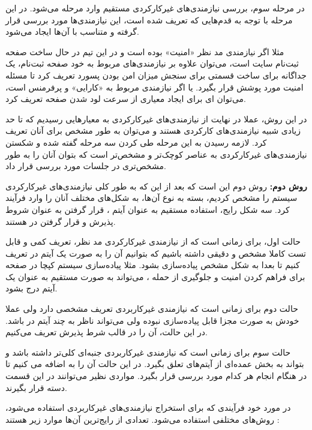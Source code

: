 {\begin{enumerate}[a)]
	در مرحله سوم، بررسی نیازمندی‌های غیرکارکردی مستقیم وارد مرحله  می‌شود. در این مرحله با توجه به قدم‌هایی که تعریف شده است، این نیازمندی‌ها مورد بررسی قرار گرفته و متناسب با آن‌ها  ایجاد می‌شود.
	
	مثلا اگر نیازمندی مد نظر «امنیت» بوده است و در این  تیم در حال ساخت صفحه ثبت‌نام سایت است، می‌توان علاوه بر نیازمندی‌های مربوط به خود صفحه ثبت‌نام، یک  جداگانه برای ساخت قسمتی برای سنجش میزان امن بودن پسورد تعریف کرد تا مسئله امنیت مورد پوشش قرار بگیرد. یا اگر نیازمندی مربوط به «کارایی» و پرفرمنس است، می‌توان ‌ای برای ایجاد معیاری از سرعت لود شدن صفحه تعریف کرد.
	
	در این روش، عملا در نهایت از نیازمندی‌های غیرکارکردی به معیارهایی رسیدیم که تا حد زیادی شبیه نیازمندی‌های کارکردی هستند و می‌توان به طور مشخص  برای آنان تعریف کرد. لازمه رسیدن به این مرحله طی کردن سه مرحله گفته شده و شکستن نیازمندی‌های غیرکارکردی به عناصر کوچک‌تر و مشخص‌تر است که بتوان آنان را به طور مشخص‌تری در جلسات  مورد بررسی قرار داد. \cite{Teamly}
	
	
	\textbf{روش دوم:}
	روش دوم این است که بعد از این که به طور کلی نیازمندی‌های غیرکارکردی سیستم را مشخص کردیم،‌ بسته به نوع آن‌ها، به شکل‌های مختلف آنان را وارد فرآیند کرد. سه شکل رایج، استفاده مستقیم به عنوان آیتم ، قرار گرفتن به عنوان شروط پذیرش و قرار گرفتن در  هستند.
	
	حالت اول،‌ برای زمانی است که از نیازمندی غیرکارکردی مد نظر، تعریف کمی و قابل تست کاملا مشخص و دقیقی داشته باشیم که بتوانیم آن را به صورت یک آیتم در  تعریف کنیم تا بعدا به شکل مشخص پیاده‌سازی بشود. مثلا پیاده‌سازی سیستم کپچا در صفحه برای فراهم کردن امنیت و جلوگیری از حمله ، می‌تواند به صورت مستقیم به عنوان یک آیتم درج بشود.
	
	حالت دوم برای زمانی است که نیازمندی غیرکاربردی تعریف مشخصی دارد ولی عملا خودش به صورت مجزا قابل پیاده‌سازی نبوده ولی می‌تواند ناظر به چند آیتم در  باشد. در این حالت، آن را در قالب شرط پذیرش تعریف می‌کنیم.
	
	حالت سوم برای زمانی است که نیازمندی غیرکاربردی جنبه‌ای کلی‌تر داشته باشد و بتواند به بخش عمده‌ای از آیتم‌های  تعلق بگیرد. در این حالت آن را به  اضافه می کنیم تا در هنگام انجام هر کدام مورد بررسی قرار بگیرد. مواردی نظیر  می‌توانند در این قسمت دسته قرار بگیرند. \cite{lightning}
	
	در مورد خود فرآیندی که برای استخراج نیازمندی‌های غیرکاربردی استفاده می‌شود، روش‌های مختلفی استفاده می‌شود. تعدادی از رایج‌ترین آن‌ها موارد زیر هستند \cite{guideline}:
	

\end{enumerate}}
